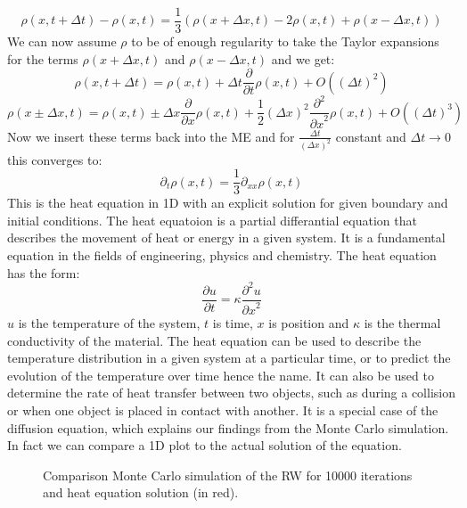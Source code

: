 \begin{equation*}
   \rho(x,t+\Delta t) - \rho(x,t)  =  \frac{1}{3} (\rho(x + \Delta x, t) - 2 \rho(x,t) + \rho(x - \Delta x, t))
\end{equation*} 
We can now assume $\rho$ to be of enough regularity to take the Taylor expansions for the terms $\rho(x + \Delta x, t)$ and $\rho(x - \Delta x, t)$ and we get:
\begin{equation*}
   \rho(x, t + \Delta t) = \rho(x, t) + \Delta t \frac{\partial}{\partial t}\rho(x, t) + O((\Delta t)^2)
\end{equation*} 
\begin{equation*}
   \rho(x \pm \Delta x, t) = \rho(x, t) \pm \Delta x \frac{\partial}{\partial x}\rho(x, t) + \frac{1}{2}(\Delta x)^2 \frac{\partial^2}{{\partial x}^2}\rho(x,t) + O((\Delta t)^3)
\end{equation*} 
Now we insert these terms back into the ME and for $\frac{\Delta t}{(\Delta x)^2}$ constant and  $\Delta t \rightarrow 0$ this converges to:
\begin{equation*}
    \partial_t \rho (x,t) = \frac{1}{3} \partial_{x x} \rho(x,t)
\end{equation*} 
This is the heat equation in 1D with an explicit solution for given boundary and initial conditions. 
The heat equatoion is a partial differantial equation that describes the movement of heat or energy in a given system.
It is a fundamental equation in the fields of engineering, physics and chemistry.
The heat equation has the form: 
\begin{equation}
\frac{\partial u}{\partial t} = \kappa \frac{{\partial}^2u}{{\partial x}^2}
\end{equation}
$u$ is the temperature of the system, $t$ is time, $x$ is position and $\kappa$ is the thermal conductivity of the material.
The heat equation can be used to describe the temperature distribution in a given system at a particular time, or to predict the evolution 
of the temperature over time hence the name. It can also be used to determine the rate of heat transfer between two objects, such as during a 
collision or when one object is placed in contact with another.
It is a special case of the diffusion equation, which explains our findings from the Monte Carlo simulation.
In fact we can compare a 1D plot to the actual solution of the equation.

\begin{figure}
   \begin{center}
      
   \end{center}
   \label{fig:fig10}
   \caption{Comparison Monte Carlo simulation of the RW for 10000 iterations and heat equation solution (in red).}
\end{figure}

